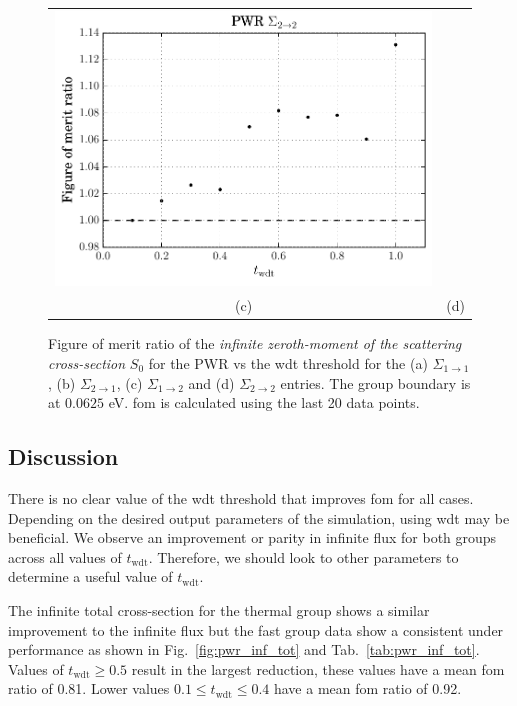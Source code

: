 \begin{figure}[hbtp]
\begin{tabular}{cc}
  \includegraphics[scale=0.6]{images/results/pwr_inf_sp0_grp_4} \\
    (c) & (d)
  \end{tabular}
  \caption[Figure of merit ratio of the \textit{infinite zeroth-moment of the
  scattering cross-section} for the PWR]{Figure of merit ratio of the
    \textit{infinite zeroth-moment of the scattering cross-section} $S_0$ for
    the PWR vs the \gls{wdt} threshold for the (a) $\Sigma_{1 \to
      1}$, (b) $\Sigma_{2 \to 1}$, (c) $\Sigma_{1 \to 2}$ and (d)
    $\Sigma_{2 \to 2}$ entries. The group boundary is at $0.0625$ eV. \gls{fom} is
    calculated using the last 20 data points.}
  \label{fig:pwr_inf_sp0}
\end{figure}
\newpage
%
\subsection{Discussion}
\label{sec:pwr_discussion}

There is no clear value of the \gls{wdt} threshold that improves
\gls{fom} for all cases. Depending on the desired output parameters of
the simulation, using \gls{wdt} may be beneficial. We observe an
improvement or parity in infinite flux for both groups across all values of
$t_\mathrm{wdt}$. Therefore, we should look to other parameters to
determine a useful value of $t_{\mathrm{wdt}}$.

The infinite total cross-section for the thermal group shows a similar
improvement to the infinite flux
but the fast group data show a consistent under performance
as shown in Fig.~\ref{fig:pwr_inf_tot} and
Tab.~\ref{tab:pwr_inf_tot}. Values of $t_{\mathrm{wdt}} \geq 0.5$
result in the largest reduction, these values have a mean \gls{fom}
ratio of 0.81. Lower values $0.1 \leq t_{\mathrm{wdt}} \leq 0.4$ have
a mean \gls{fom} ratio of 0.92.

